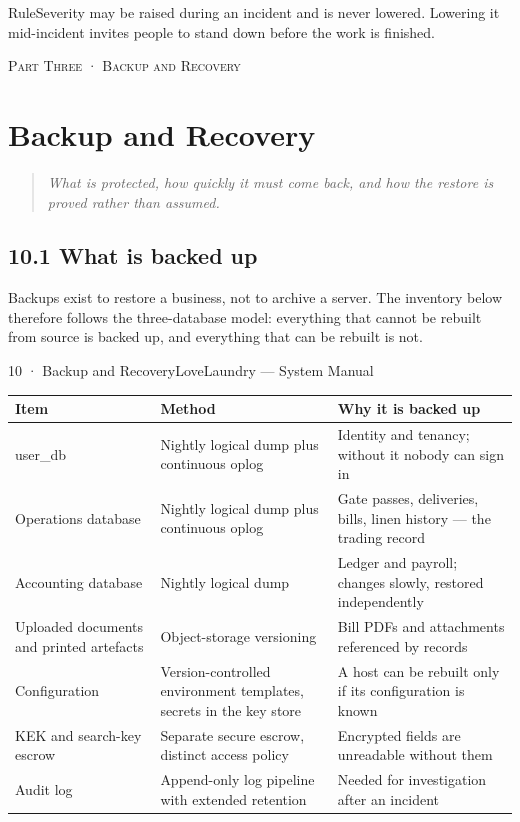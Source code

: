 \documentclass[11pt,a4paper,oneside]{book}
\begin{document}
\begin{notebox}RuleSeverity may be raised during an incident and is never lowered. Lowering it mid-incident invites people to stand down before the work is finished.\end{notebox}
\textsc{\small\color{crimson}Part Three · Backup and Recovery}\par\medskip
\chapter{Backup and Recovery}
\begin{quote}\itshape What is protected, how quickly it must come back, and how the restore is proved rather than assumed.\end{quote}
\section{10.1 What is backed up}
Backups exist to restore a business, not to archive a server. The inventory below therefore follows the three-database model: everything that cannot be rebuilt from source is backed up, and everything that can be rebuilt is not.

10 · Backup and RecoveryLoveLaundry — System Manual

\begin{center}\small
\begin{tabularx}{\linewidth}{|X|X|X|}
\hline
\rowcolor{lightgrey}
\textbf{Item} & \textbf{Method} & \textbf{Why it is backed up} \\ \hline
user\_db & Nightly logical dump plus continuous oplog & Identity and tenancy; without it nobody can sign in \\ \hline
Operations database & Nightly logical dump plus continuous oplog & Gate passes, deliveries, bills, linen history — the trading record \\ \hline
Accounting database & Nightly logical dump & Ledger and payroll; changes slowly, restored independently \\ \hline
Uploaded documents and printed artefacts & Object-storage versioning & Bill PDFs and attachments referenced by records \\ \hline
Configuration & Version-controlled environment templates, secrets in the key store & A host can be rebuilt only if its configuration is known \\ \hline
KEK and search-key escrow & Separate secure escrow, distinct access policy & Encrypted fields are unreadable without them \\ \hline
Audit log & Append-only log pipeline with extended retention & Needed for investigation after an incident \\ \hline
\end{tabularx}
\end{center}
\end{document}
